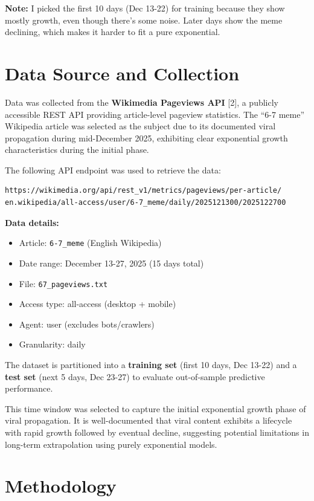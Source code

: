 \documentclass[11pt]{article}
\begin{document}
\textbf{Note:} I picked the first 10 days (Dec 13-22) for training because they show mostly growth, even though there's some noise. Later days show the meme declining, which makes it harder to fit a pure exponential.

\section{Data Source and Collection}

Data was collected from the \textbf{Wikimedia Pageviews API} [2], a publicly accessible REST API providing article-level pageview statistics. The ``6-7 meme'' Wikipedia article was selected as the subject due to its documented viral propagation during mid-December 2025, exhibiting clear exponential growth characteristics during the initial phase.

The following API endpoint was used to retrieve the data:
\begin{verbatim}
https://wikimedia.org/api/rest_v1/metrics/pageviews/per-article/
en.wikipedia/all-access/user/6-7_meme/daily/2025121300/2025122700
\end{verbatim}

\textbf{Data details:}
\begin{itemize}
    \item Article: \texttt{6-7\_meme} (English Wikipedia)
    \item Date range: December 13-27, 2025 (15 days total)
    \item File: \texttt{67\_pageviews.txt}
    \item Access type: all-access (desktop + mobile)
    \item Agent: user (excludes bots/crawlers)
    \item Granularity: daily
\end{itemize}

The dataset is partitioned into a \textbf{training set} (first 10 days, Dec 13-22) and a \textbf{test set} (next 5 days, Dec 23-27) to evaluate out-of-sample predictive performance.

This time window was selected to capture the initial exponential growth phase of viral propagation. It is well-documented that viral content exhibits a lifecycle with rapid growth followed by eventual decline, suggesting potential limitations in long-term extrapolation using purely exponential models.

\section{Methodology}
\end{document}
